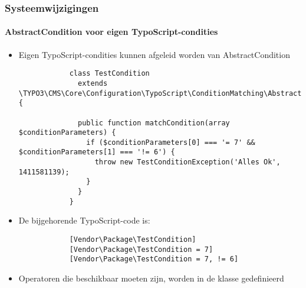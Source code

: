 \begin{frame}[fragile]
	\frametitle{Systeemwijzigingen}
	\framesubtitle{AbstractCondition voor eigen TypoScript-condities}

	\lstset{
		basicstyle=\tiny\ttfamily
	}

	\begin{itemize}
		\item Eigen TypoScript-condities kunnen afgeleid worden van AbstractCondition

		\begin{lstlisting}
			class TestCondition
			  extends \TYPO3\CMS\Core\Configuration\TypoScript\ConditionMatching\AbstractCondition {

			  public function matchCondition(array $conditionParameters) {
 			    if ($conditionParameters[0] === '= 7' && $conditionParameters[1] === '!= 6') {
			      throw new TestConditionException('Alles Ok', 1411581139);
			    }
			  }
			}
		\end{lstlisting}

		\item De bijgehorende TypoScript-code is:

		\begin{lstlisting}
			[Vendor\Package\TestCondition]
			[Vendor\Package\TestCondition = 7]
			[Vendor\Package\TestCondition = 7, != 6]
		\end{lstlisting}

		\item Operatoren die beschikbaar moeten zijn, worden in de klasse gedefinieerd

	\end{itemize}

\end{frame}


